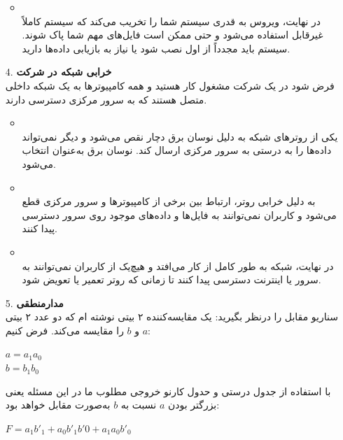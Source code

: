 \begin{qsolve}
	\begin{enumerate}
		\item [ ]
		\begin{itemize}
			\item {}\\
			در نهایت، ویروس به قدری سیستم شما را تخریب می‌کند که سیستم کاملاً غیرقابل استفاده می‌شود و حتی ممکن است فایل‌های مهم شما پاک شوند. سیستم باید مجدداً از اول نصب شود یا نیاز به بازیابی داده‌ها دارید.
		\end{itemize}
		
		\item [4.]
		\textbf{خرابی شبکه در شرکت}\\
		فرض شود در یک شرکت مشغول کار هستید و همه کامپیوترها به یک شبکه داخلی متصل هستند که به سرور مرکزی دسترسی دارند.
		
		\begin{itemize}
			\item {}\\
			یکی از روترهای شبکه به دلیل نوسان برق دچار نقص می‌شود و دیگر نمی‌تواند داده‌ها را به درستی به سرور مرکزی ارسال کند. نوسان برق به‌عنوان  انتخاب می‌شود.
			
			\item {}\\
			به دلیل خرابی روتر، ارتباط بین برخی از کامپیوترها و سرور مرکزی قطع می‌شود و کاربران نمی‌توانند به فایل‌ها و داده‌های موجود روی سرور دسترسی پیدا کنند.
			
			\item {}\\
			در نهایت، شبکه به طور کامل از کار می‌افتد و هیچ‌یک از کاربران نمی‌توانند به سرور یا اینترنت دسترسی پیدا کنند تا زمانی که روتر تعمیر یا تعویض شود.
		\end{itemize}
		
		
		\item [5.]
		\textbf{مدارمنطقی}\\
		سناریو مقابل را درنظر بگیرید: یک مقایسه‌کننده ۲ بیتی نوشته ام که دو عدد ۲ بیتی $a$ و $b$ را مقایسه می‌کند. فرض کنیم:‌ 
		\begin{center}
			\begin{latin}
				$a=a_1a_0$\\
				$b=b_1b_0$ 
			\end{latin} 
		\end{center}
		
		
		با استفاده از جدول درستی و حدول کارنو خروجی مطلوب ما در این مسئله یعنی بزرگتر بودن $a$ نسبت به $b$ به‌صورت مقابل خواهد بود:
		\begin{center}
			\begin{latin}
				$F=a_1b'_1 + a_0b'_1b'0 + a_1a_0b'_0$
			\end{latin}
		\end{center}
	\end{enumerate}
\end{qsolve}



